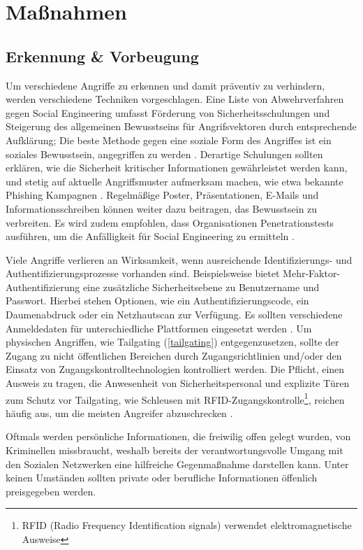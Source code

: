 \chapter{Maßnahmen}
\label{chapter:massnahmen}

\section{Erkennung \& Vorbeugung}

Um verschiedene Angriffe zu erkennen und damit präventiv zu verhindern, werden verschiedene Techniken vorgeschlagen.
Eine Liste von Abwehrverfahren gegen Social Engineering umfasst Förderung von Sicherheitsschulungen und Steigerung des allgemeinen Bewusstseins für Angrifsvektoren durch entsprechende Aufklärung;
Die beste Methode gegen eine soziale Form des Angriffes ist ein soziales Bewusstsein, angegriffen zu werden .
Derartige Schulungen sollten erklären, wie die Sicherheit kritischer Informationen gewährleistet werden kann, und stetig auf aktuelle Angriffsmuster aufmerksam machen, wie etwa bekannte Phishing Kampagnen .
Regelmäßige Poster, Präsentationen, E-Mails und Informationsschreiben können weiter dazu beitragen, das Bewusstsein zu verbreiten.
Es wird zudem empfohlen, dass Organisationen Penetrationstests ausführen, um die Anfälligkeit für Social Engineering zu ermitteln .

Viele Angriffe verlieren an Wirksamkeit, wenn ausreichende Identifizierungs- und Authentifizierungsprozesse vorhanden sind.
Beispielsweise bietet Mehr-Faktor-Authentifizierung eine zusätzliche Sicherheitsebene zu Benutzername und Passwort.
Hierbei stehen Optionen, wie ein Authentifizierungscode, ein Daumenabdruck oder ein Netzhautscan zur Verfügung.
Es sollten verschiedene Anmeldedaten für unterschiedliche Plattformen eingesetzt werden .
Um physischen Angriffen, wie Tailgating (\autoref{tailgating}) entgegenzusetzen, sollte der Zugang zu nicht öffentlichen Bereichen durch Zugangsrichtlinien und/oder den Einsatz von Zugangskontrolltechnologien kontrolliert werden.
Die Pflicht, einen Ausweis zu tragen, die Anwesenheit von Sicherheitspersonal und explizite Türen zum Schutz vor Tailgating,
wie Schleusen mit RFID-Zugangskontrolle\footnote{RFID (Radio Frequency Identification signals) verwendet elektromagnetische Ausweise}, reichen häufig aus, um die meisten Angreifer abzuschrecken .

Oftmals werden persönliche Informationen, die freiwilig offen gelegt wurden, von Kriminellen missbraucht, weshalb bereits der verantwortungsvolle Umgang mit den Sozialen Netzwerken eine hilfreiche Gegenmaßnahme darstellen kann.
Unter keinen Umständen sollten private oder berufliche Informationen öffenlich preisgegeben werden.

